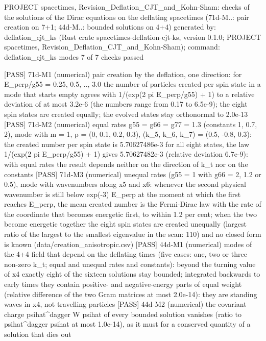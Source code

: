 \documentclass[
  10pt,
]{article}
\newenvironment{Shaded}{}{}
\newcommand{\NormalTok}[1]{#1}
\begin{document}
\begin{Shaded}
\begin{Highlighting}[]
\NormalTok{PROJECT spacetimes, Revision\_Deflation\_CJT\_and\_Kohn{-}Sham: checks of the solutions of the Dirac equations on the deflating spacetimes (71d{-}M..: pair creation on 7+1; 44d{-}M..: bounded solutions on 4+4)}
\NormalTok{generated by: deflation\_cjt\_ks (Rust crate spacetimes{-}deflation{-}cjt{-}ks, version 0.1.0; PROJECT spacetimes, Revision\_Deflation\_CJT\_and\_Kohn{-}Sham); command: deflation\_cjt\_ks modes}
\NormalTok{7 of 7 checks passed}

\NormalTok{[PASS] 71d{-}M1  (numerical) pair creation by the deflation, one direction: for E\_perp/g55 = 0.25, 0.5, .., 3.0 the number of particles created per spin state in a mode that starts empty agrees with 1/(exp(2 pi E\_perp/g55) + 1) to a relative deviation of at most 3.2e{-}6 (the numbers range from 0.17 to 6.5e{-}9); the eight spin states are created equally; the evolved states stay orthonormal to 2.0e{-}13}
\NormalTok{[PASS] 71d{-}M2  (numerical) equal rates g55 = g66 = g77 = 1.3 (constants 1, 0.7, 2), mode with m = 1, p = (0, 0.1, 0.2, 0.3), (k\_5, k\_6, k\_7) = (0.5, {-}0.8, 0.3): the created number per spin state is 5.70627486e{-}3 for all eight states, the law 1/(exp(2 pi E\_perp/g55) + 1) gives 5.70627482e{-}3 (relative deviation 6.7e{-}9): with equal rates the result depends neither on the direction of k\_t nor on the constants}
\NormalTok{[PASS] 71d{-}M3  (numerical) unequal rates (g55 = 1 with g66 = 2, 1.2 or 0.5), mode with wavenumbers along x5 and x6: whenever the second physical wavenumber is still below exp({-}3) E\_perp at the moment at which the first reaches E\_perp, the mean created number is the Fermi{-}Dirac law with the rate of the coordinate that becomes energetic first, to within 1.2 per cent; when the two become energetic together the eight spin states are created unequally (largest ratio of the largest to the smallest eigenvalue in the scan: 110) and no closed form is known (data/creation\_anisotropic.csv)}
\NormalTok{[PASS] 44d{-}M1  (numerical) modes of the 4+4 field that depend on the deflating times (five cases: one, two or three non{-}zero k\_t; equal and unequal rates and constants): beyond the turning value of x4 exactly eight of the sixteen solutions stay bounded; integrated backwards to early times they contain positive{-} and negative{-}energy parts of equal weight (relative difference of the two Gram matrices at most 2.0e{-}14): they are standing waves in x4, not travelling particles}
\NormalTok{[PASS] 44d{-}M2  (numerical) the covariant charge psihat\^{}dagger W psihat of every bounded solution vanishes (ratio to psihat\^{}dagger psihat at most 1.0e{-}14), as it must for a conserved quantity of a solution that dies out}

\end{Highlighting}
\end{Shaded}
\end{document}
